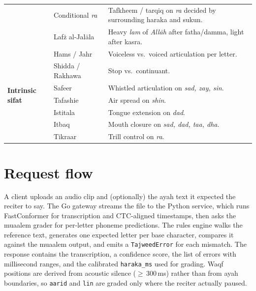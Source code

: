 \begin{longtable}{p{2.6cm} p{4.2cm} p{7.4cm}}
  & Conditional \emph{ra}     & Tafkheem / tarqiq on \emph{ra} decided by surrounding haraka and sukun. \\
  & Laf\.z al-Jal\=ala        & Heavy \emph{lam} of \emph{All\=ah} after fatha/damma, light after kasra. \\
\midrule
\multirow{7}{*}{\textbf{Intrinsic sifat}}
  & Hams / Jahr               & Voiceless vs.\ voiced articulation per letter. \\
  & Shidda / Rakhawa          & Stop vs.\ continuant. \\
  & Safeer                    & Whistled articulation on \emph{sad, zay, sin}. \\
  & Tafashie                  & Air spread on \emph{shin}. \\
  & Istitala                  & Tongue extension on \emph{dad}. \\
  & Itbaq                     & Mouth closure on \emph{sad, dad, taa, dha}. \\
  & Tikraar                   & Trill control on \emph{ra}. \\
\bottomrule
\end{longtable}

\section{Request flow}
\label{sec:app_server_flow}

A client uploads an audio clip and (optionally) the ayah text it
expected the reciter to say. The Go gateway streams the file to the
Python service, which runs FastConformer for transcription and
CTC-aligned timestamps, then asks the muaalem grader for per-letter
phoneme predictions. The rules engine walks the reference text,
generates one expected letter per base character, compares it against
the muaalem output, and emits a \texttt{TajweedError} for each
mismatch. The response contains the transcription, a confidence score,
the list of errors with millisecond ranges, and the calibrated
\texttt{haraka\_ms} used for grading. Waqf positions are derived from
acoustic silence (${\geq}\,300$\,ms) rather than from ayah boundaries,
so \texttt{aarid} and \texttt{lin} are graded only where the reciter
actually paused.
